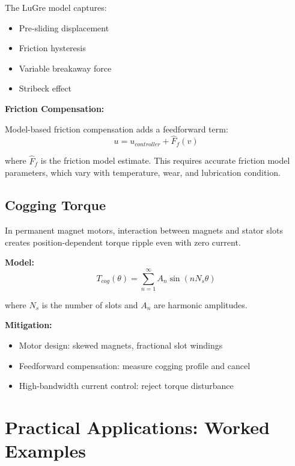 The LuGre model captures:
\begin{itemize}
    \item Pre-sliding displacement
    \item Friction hysteresis
    \item Variable breakaway force
    \item Stribeck effect
\end{itemize}

\textbf{Friction Compensation:}

Model-based friction compensation adds a feedforward term:
\begin{equation}
    u = u_{controller} + \hat{F}_f(v)
\end{equation}

where $\hat{F}_f$ is the friction model estimate. This requires accurate friction model parameters, which vary with temperature, wear, and lubrication condition.

\subsection{Cogging Torque}

In permanent magnet motors, interaction between magnets and stator slots creates position-dependent torque ripple even with zero current.

\textbf{Model:}
\begin{equation}
    T_{cog}(\theta) = \sum_{n=1}^{\infty} A_n \sin(n N_s \theta)
\end{equation}

where $N_s$ is the number of slots and $A_n$ are harmonic amplitudes.

\textbf{Mitigation:}
\begin{itemize}
    \item Motor design: skewed magnets, fractional slot windings
    \item Feedforward compensation: measure cogging profile and cancel
    \item High-bandwidth current control: reject torque disturbance
\end{itemize}

\section{Practical Applications: Worked Examples}
\label{sec:actuator_examples}

